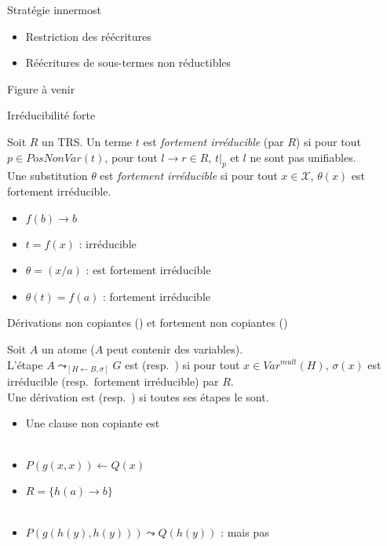 \begin{frame}{Stratégie innermost}
  \begin{itemize}
  \item Restriction des réécritures
  \item Réécritures de sous-termes non réductibles
  \end{itemize}
  \begin{center}
    Figure à venir
  \end{center}
\end{frame}

\begin{frame}{Irréducibilité forte}
  \begin{Definition}
    Soit $R$ un TRS.
    Un terme $t$ est {\em fortement irréducible} (par $R$) si
    pour tout $p \in \textit{PosNonVar}(t)$, pour tout $l \rightarrow r \in R$,
    $t|_p$ et $l$ ne sont pas unifiables.\\
    Une substitution $\theta$ est {\em fortement irréducible} si
    pour tout $x \in \mathcal{X}$, $\theta(x)$ est fortement irréducible.
  \end{Definition}
  \begin{itemize}
  \item {} $f(b) \rightarrow b$
  \item {} $t = f(x)$ :  irréducible
  \item {} $\theta = (x/a)$ :  est fortement irréducible
  \item {} $\theta(t) = f(a)$ :  fortement irréducible
  \end{itemize}
\end{frame}

\begin{frame}{Dérivations non copiantes (\nc) et fortement non copiantes (\snc)}
  \begin{Definition}
    Soit $A$ un atome ($A$ peut contenir des variables).\\
    L'étape $A \leadsto_{[H\leftarrow B,\sigma]} G$ est \nc (resp.\ \snc) si
    pour tout $x \in Var^{mult}(H)$, $\sigma(x)$ est irréducible (resp.\ fortement irréducible) par $R$.\\
    Une dérivation est \nc (resp.\ \snc) si toutes ses étapes le sont.
  \end{Definition}
  \begin{itemize}[<+->]
  \item Une clause non copiante est \snc \\~
    
  \item $P(g(x,x)) \leftarrow Q(x)$
  \item $R = \{h(a) \rightarrow b\}$ \\~

  \item $P(g(h(y),h(y))) \leadsto Q(h(y))$ : \nc mais pas \snc
  \end{itemize}
\end{frame}

